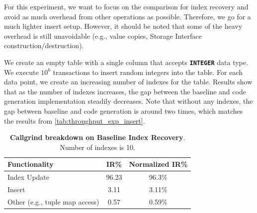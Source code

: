 \documentclass[12pt]{cmuthesis}
\newcommand{\dbSQL}[1]{\texttt{\textbf{#1}}\xspace}
\begin{document}
For this experiment, we want to focus on the comparison for index recovery and avoid as much overhead from other operations as possible. Therefore, we go for a much lighter insert setup. However, it should be noted that some of the heavy overhead is still unavoidable (e.g., value copies, Storage Interface construction/destruction).

We create an empty table with a single column that accepts \dbSQL{INTEGER} data type. We execute $10^6$ transactions to insert random integers into the table. For each data point, we create an increasing number of indexes for the table. Results show that as the number of indexes increases, the gap between the baseline and code generation implementation steadily decreases. Note that without any indexes, the gap between baseline and code generation is around two times, which matches the results from \cref{tab:throughput_exp_insert}.

\begin{table}[H]
\begin{center}
\begin{tabular}{ l c c } 
 \toprule
\textbf{Functionality} & \textbf{IR\%} & \textbf{Normalized IR\%}\\ 
 \toprule
Index Update & 96.23 & 96.3\% \\
 \midrule
Insert & 3.11 & 3.11\% \\ 
 \midrule
Other (e.g., tuple map access) & 0.57 & 0.59\% \\
 \bottomrule
\end{tabular}
\caption{\textbf{Callgrind breakdown on Baseline Index Recovery}.  Number of indexes is 10.}
\label{tab:throughput_exp_insert_overhead_all}
\end{center}
\end{table}
\end{document}
